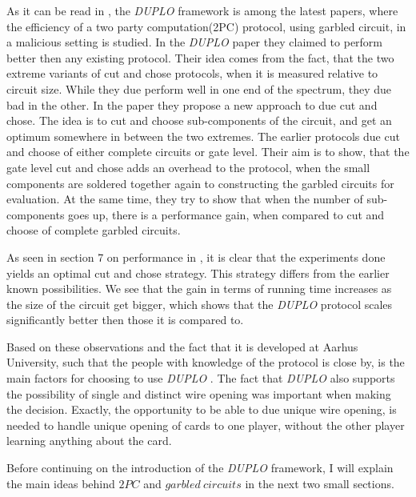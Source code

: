 \documentclass[twoside,11pt,openright]{report}
\newcommand{\DUPLO}{\textit{DUPLO} }
\begin{document}
\bigskip

As it can be read in \cite{duplo}, the \DUPLO framework is among the latest papers, where the efficiency of a two party computation(2PC) protocol, using garbled circuit, in a malicious setting is studied. In the \DUPLO paper they claimed to perform better then any existing protocol. Their idea comes from the fact, that the two extreme variants of cut and chose protocols, when it is measured relative to circuit size. While they due perform well in one end of the spectrum, they due bad in the other. In the paper they propose a new approach to due cut and chose. The idea is to cut and choose sub-components of the circuit, and get an optimum somewhere in between the two extremes. The earlier protocols due cut and choose of either complete circuits or gate level. Their aim is to show, that the gate level cut and chose adds an overhead to the protocol, when the small components are soldered together again to constructing the garbled circuits for evaluation. At the same time, they try to show that when the number of sub-components goes up, there is a performance gain, when compared to cut and choose of complete garbled circuits.

As seen in section 7 on performance in \cite{duplo}, it is clear that the experiments done yields an optimal cut and chose strategy. This strategy differs from the earlier known possibilities. We see that the gain in terms of running time increases as the size of the circuit get bigger, which shows that the \DUPLO protocol scales significantly better then those it is compared to.

\bigskip

Based on these observations and the fact that it is developed at Aarhus University, such that the people with knowledge of the protocol is close by, is the main factors for choosing to use \DUPLO. The fact that \DUPLO also supports the possibility of single and distinct wire opening was important when making the decision. Exactly, the opportunity to be able to due unique wire opening, is needed to handle unique opening of cards to one player, without the other player learning anything about the card.

\bigskip

Before continuing on the introduction of the \DUPLO framework, I will explain the main ideas behind $2PC$ and $garbled~circuits$ in the next two small sections.

\bigskip
\end{document}
